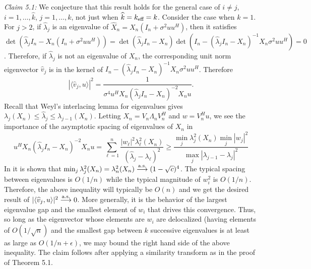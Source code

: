 \documentclass[11pt]{article}
\begin{document}
\textit{Claim 5.1:}  We conjecture that this result holds for the general case of $i\neq
j$, $i=1,\dots,\widehat{k}$, $j=1,\dots,k$, not just when $\widehat{k}=k_\text{eff}=k$. Consider
the case when $k=1$. For $j>2$, if $\widehat{\lambda}_j$ is an eigenvalue of
$\widehat{X}_n=X_n(I_n+\sigma^2uu^H)$, then it satisfies
$\det(\widehat{\lambda}_jI_n-X_n(I_n+\sigma^2uu^H)) =
\det(\widehat{\lambda}_jI_n-X_n)\det(I_n-(\widehat{\lambda}_jI_n-X_n)^{-1}X_n\sigma^2uu^H)=0$. Therefore,
if $\widehat{\lambda}_j$ is not an eigenvalue of $X_n$, the corresponding unit norm
eigenvector $\widehat{v}_j$ is in the kernel of
$I_n-(\widehat{\lambda}_jI_n-X_n)^{-1}X_n\sigma^2uu^H$. Therefore
\begin{equation*}
  |\langle \widehat{v}_j,u\rangle |^2 = \frac{1}{\sigma^4u^HX_n\left(\widehat{\lambda}_jI_n-X_n\right)^{-2}X_nu}.
\end{equation*}
Recall that Weyl's interlacing lemma for eigenvalues gives $\lambda_j(X_n)\leq
\widehat{\lambda}_j\leq \lambda_{j-1}(X_n)$. Letting $X_n=V_n\Lambda_nV_n^H$ and
$w=V_n^Hu$, we see the importance of the
asymptotic spacing of eigenvalues of $X_n$ in
\begin{equation*}
  u^HX_n(\widehat{\lambda}_jI_n-X_n)^{-2}X_nu
  =\sum_{\ell=1}^n\frac{|w_\ell|^2\lambda_\ell^2(X_n)}{\left(\widehat{\lambda}_j-\lambda_\ell\right)^2}\geq
  \frac{\min_j\lambda_j^2(X_n)\min_j|w_j|^2}{\max_j |\lambda_{j-1}-\lambda_j|^2}
\end{equation*}
In  \cite{jiang2004limiting} it is shown that $\min_j\lambda_j^2(X_n)=\lambda_n^2(X_n)
\overset{\textrm{a.s.}}{\longrightarrow} (1-\sqrt{c})^4$. The typical spacing between eigenvalues is $O(1/n)$ while the
typical magnitude of $w_i^2$ is $O(1/n)$. Therefore, the above inequality will typically be $O(n)$ and we get the desired
result of $|\langle \widehat{v}_j,u\rangle |^2\overset{\textrm{a.s.}}{\longrightarrow} 0$. More generally, it is the
behavior of the largest eigenvalue gap and the smallest element of $w_i$ that drives this
convergence. Thus, so long as the eigenvector whose elements are $w_i$ are delocalized
(having elements of $O(1/\sqrt{n})$ and the smallest gap between $k$ successive
eigenvalues is at least as large as $O(1/n + \epsilon)$, we may bound the right hand side
of the above inequality. The claim follows after applying a similarity transform as in the
proof of Theorem 5.1.
 
\end{document}

